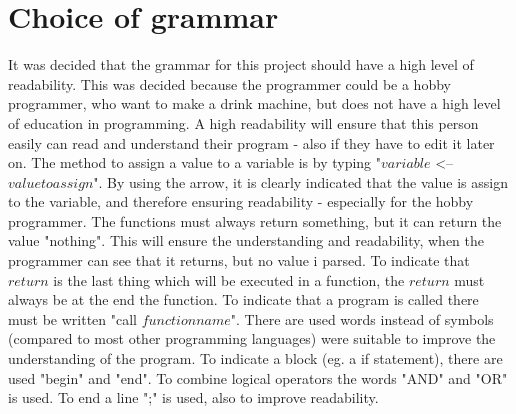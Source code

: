 
\section{Choice of grammar}
It was decided that the grammar for this project should have a high level of readability. This was decided because the programmer could be a hobby programmer, who want to make a drink machine, but does not have a high level of education in programming. A high readability will ensure that this person easily can read and understand their program - also if they have to edit it later on. The method to assign a value to a variable is by typing "$variable$ <-- $value to assign$". By using the arrow, it is clearly indicated that the value is assign to the variable, and therefore ensuring readability - especially for the hobby programmer.
The functions must always return something, but it can return the value "nothing". This will ensure the understanding and readability, when the programmer can see that it returns, but no value i parsed. To indicate that $return$ is the last thing which will be executed in a function, the $return$ must always be at the end the function. To indicate that a program is called there must be written "call $functionname$".
There are used words instead of symbols (compared to most other programming languages) were suitable to improve the understanding of the program. To indicate a block (eg. a if statement), there are used "begin" and "end". To combine logical operators the words "AND" and "OR" is used. To end a line ";" is used, also to improve readability.